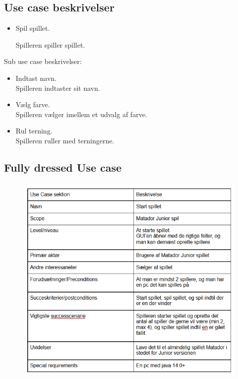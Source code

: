 \subsection{Use case beskrivelser}
\begin{itemize}
	\item Spil spillet.
	
Spilleren spiller spillet.
\end{itemize}
Sub use case beskrivelser:
\begin{itemize}
	\item Indtast navn.\\ Spilleren indtaster sit navn.
	\item Vælg farve. \\ Spilleren vælger imellem et udvalg af farve.
	\item Rul terning. \\ Spilleren ruller med terningerne.
\end{itemize}

\subsection{Fully dressed Use case}
\begin{figure}[h!]
\includegraphics[scale=1]{artifacts/fullyDressed.png}
\end{figure}
\newpage
